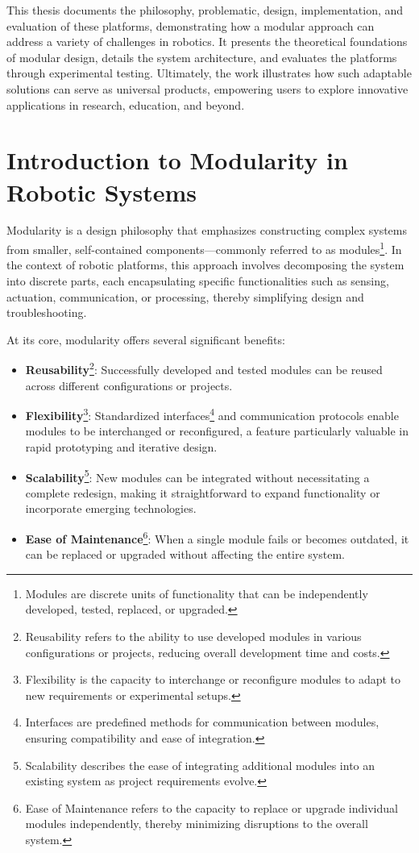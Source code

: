This thesis documents the philosophy, problematic, design, implementation, and evaluation of these platforms, demonstrating how a modular approach can address a variety of challenges in robotics. It presents the theoretical foundations of modular design, details the system architecture, and evaluates the platforms through experimental testing. Ultimately, the work illustrates how such adaptable solutions can serve as universal products, empowering users to explore innovative applications in research, education, and beyond.

\section{Introduction to Modularity in Robotic Systems}
Modularity is a design philosophy that emphasizes constructing complex systems from smaller, self-contained components—commonly referred to as modules\footnote{Modules are discrete units of functionality that can be independently developed, tested, replaced, or upgraded.}. In the context of robotic platforms, this approach involves decomposing the system into discrete parts, each encapsulating specific functionalities such as sensing, actuation, communication, or processing, thereby simplifying design and troubleshooting.

At its core, modularity offers several significant benefits:

\begin{itemize}
  \item \textbf{Reusability}\footnote{Reusability refers to the ability to use developed modules in various configurations or projects, reducing overall development time and costs.}: Successfully developed and tested modules can be reused across different configurations or projects.
  \item \textbf{Flexibility}\footnote{Flexibility is the capacity to interchange or reconfigure modules to adapt to new requirements or experimental setups.}: Standardized interfaces\footnote{Interfaces are predefined methods for communication between modules, ensuring compatibility and ease of integration.} and communication protocols enable modules to be interchanged or reconfigured, a feature particularly valuable in rapid prototyping and iterative design.
  \item \textbf{Scalability}\footnote{Scalability describes the ease of integrating additional modules into an existing system as project requirements evolve.}: New modules can be integrated without necessitating a complete redesign, making it straightforward to expand functionality or incorporate emerging technologies.
  \item \textbf{Ease of Maintenance}\footnote{Ease of Maintenance refers to the capacity to replace or upgrade individual modules independently, thereby minimizing disruptions to the overall system.}: When a single module fails or becomes outdated, it can be replaced or upgraded without affecting the entire system.
\end{itemize}

